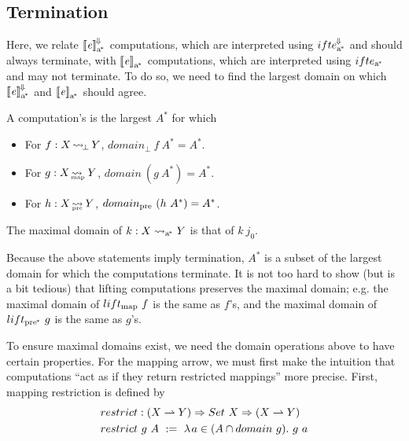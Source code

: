 \subsection{Termination}

Here, we relate $\left\llbracket{\mathit{e}}\right\rrbracket^{\mspace{-2mu}\Downarrow\mspace{-2mu}}_\mathrm{a^{\mspace{-2mu}*}}$ computations, which are interpreted using $ifte^{\mspace{-2mu}\Downarrow\mspace{-2mu}}_\mathrm{a^{\mspace{-2mu}*}}$ and should always terminate, with $\left\llbracket{\mathit{e}}\right\rrbracket_\mathrm{a^{\mspace{-2mu}*}}$ computations, which are interpreted using $ifte_\mathrm{a^{\mspace{-2mu}*}}$ and may not terminate.
To do so, we need to find the largest domain on which $\left\llbracket{\mathit{e}}\right\rrbracket^{\mspace{-2mu}\Downarrow\mspace{-2mu}}_\mathrm{a^{\mspace{-2mu}*}}$ and $\left\llbracket{\mathit{e}}\right\rrbracket_\mathrm{a^{\mspace{-2mu}*}}$ should agree.

\begin{definition}
\label{def:maximal-domain}
A computation's  is the largest $A^*$ for which
\begin{itemize}
	\item For $f : X \operatorname{\rightsquigarrow_{\mspace{-3mu}\bot}} Y$, $domain_\bot~f~A^* = A^*$.
	\item For $g : X \operatorname{\rightsquigarrow_{\mspace{-23mu}_\mathrm{map}}} Y$, $domain~(g~A^*) = A^*$.
	\item For $h : X \operatorname{\rightsquigarrow_{\mspace{-22mu}_\mathrm{pre}}} Y$, $domain_\mathrm{pre}~(h~A^*) = A^*$.
\end{itemize}
The maximal domain of $k : X \rightsquigarrow_\mathrm{a^{\mspace{-2mu}*}} Y$ is that of $k~j_0$.
\end{definition}

Because the above statements imply termination, $A^*$ is a subset of the largest domain for which the computations terminate.
It is not too hard to show (but is a bit tedious) that lifting computations preserves the maximal domain; e.g. the maximal domain of $lift_\mathrm{map}~f$ is the same as $f$'s, and the maximal domain of $lift_\mathrm{pre^{\mspace{-2mu}*}}~g$ is the same as $g$'s.

To ensure maximal domains exist, we need the domain operations above to have certain properties.
For the mapping arrow, we must first make the intuition that computations ``act as if they return restricted mappings'' more precise.
First, mapping restriction is defined by
\begin{equation}
\begin{aligned}
	&restrict : (X \rightharpoonup Y) \Rightarrow Set~X \Rightarrow (X \rightharpoonup Y) \\
	&restrict~g~A \ := \ \lambda\mspace{2mu}{a \in (A \cap domain~g)}\ldotp\,{g~a}
\end{aligned}
\end{equation}

